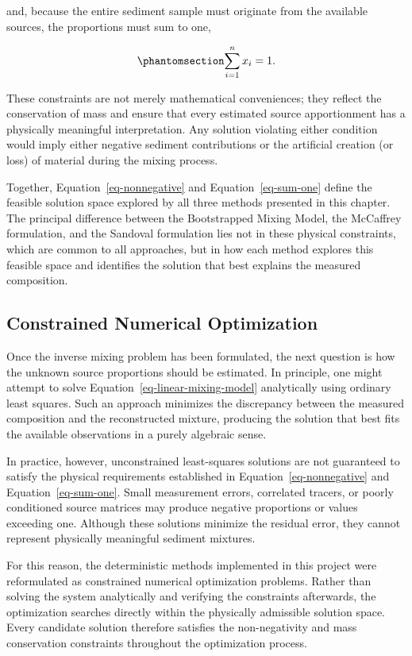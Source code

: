 \documentclass[
  12pt,
  letterpaper,
]{book}
\begin{document}
and, because the entire sediment sample must originate from the
available sources, the proportions must sum to one,

\begin{equation}\phantomsection\label{eq-sum-one}{
\sum_{i=1}^{n} x_i = 1.
}\end{equation}

These constraints are not merely mathematical conveniences; they reflect
the conservation of mass and ensure that every estimated source
apportionment has a physically meaningful interpretation. Any solution
violating either condition would imply either negative sediment
contributions or the artificial creation (or loss) of material during
the mixing process.

Together, Equation~\ref{eq-nonnegative} and Equation~\ref{eq-sum-one}
define the feasible solution space explored by all three methods
presented in this chapter. The principal difference between the
Bootstrapped Mixing Model, the McCaffrey formulation, and the Sandoval
formulation lies not in these physical constraints, which are common to
all approaches, but in how each method explores this feasible space and
identifies the solution that best explains the measured composition.

\subsection{Constrained Numerical
Optimization}\label{constrained-numerical-optimization}

Once the inverse mixing problem has been formulated, the next question
is how the unknown source proportions should be estimated. In principle,
one might attempt to solve Equation~\ref{eq-linear-mixing-model}
analytically using ordinary least squares. Such an approach minimizes
the discrepancy between the measured composition and the reconstructed
mixture, producing the solution that best fits the available
observations in a purely algebraic sense.

In practice, however, unconstrained least-squares solutions are not
guaranteed to satisfy the physical requirements established in
Equation~\ref{eq-nonnegative} and Equation~\ref{eq-sum-one}. Small
measurement errors, correlated tracers, or poorly conditioned source
matrices may produce negative proportions or values exceeding one.
Although these solutions minimize the residual error, they cannot
represent physically meaningful sediment mixtures.

For this reason, the deterministic methods implemented in this project
were reformulated as constrained numerical optimization problems. Rather
than solving the system analytically and verifying the constraints
afterwards, the optimization searches directly within the physically
admissible solution space. Every candidate solution therefore satisfies
the non-negativity and mass conservation constraints throughout the
optimization process.
\end{document}
